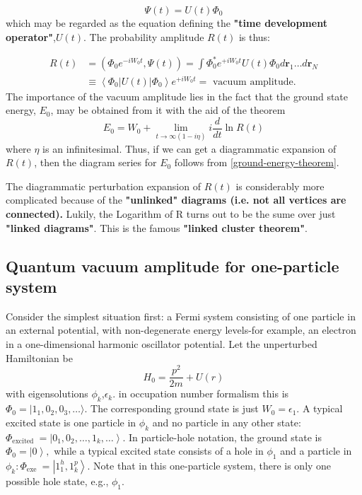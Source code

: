 \begin{equation}\Psi(t)=U(t) \Phi_{0}\end{equation}
which may be regarded as the equation defining the \textbf{"time development operator"},$U(t)$. The probability amplitude $R(t)$ is thus:
\begin{imp}
\begin{equation}\begin{aligned}
R(t) &=\left(\Phi_{0} e^{-i W_{0} t}, \Psi(t)\right)=\int \Phi_{0}^{*} e^{+i W_{0} t} U(t) \Phi_{0} d \mathbf{r}_{1} \dots d \mathbf{r}_{N} \\
& \equiv\left\langle\Phi_{0}|U(t)| \Phi_{0}\right\rangle e^{+i W_{0} t}=\text { vacuum amplitude. }
\end{aligned}
\label{vac-amp-def}
\end{equation}
The importance of the vacuum amplitude lies in the fact that the ground state energy, $E_{0}$, may be obtained from it with the aid of the theorem
\begin{equation}E_{0}=W_{0}+\lim _{t \rightarrow \infty(1-i \eta)} i \frac{d}{d t} \ln R(t)
\label{ground-energy-theorem}
\end{equation}
where $\eta$ is an infinitesimal. Thus, if we can get a diagrammatic expansion of $R(t)$, then the diagram series for $E_0$ follows from \ref{ground-energy-theorem}.
\end{imp}
\begin{mybox}
The diagrammatic perturbation expansion of $R(t)$ is considerably more complicated because of the \textbf{"unlinked" diagrams (i.e. not all vertices are connected).} Lukily, the Logarithm of R turns out to be the sume over just \textbf{"linked diagrams"}. This is the famous \textbf{"linked cluster theorem"}.
\end{mybox}

\subsection{Quantum vacuum amplitude for one-particle system}
Consider the simplest situation first: a Fermi system consisting of one particle in an external potential, with non-degenerate energy levels-for example, an electron in a one-dimensional harmonic oscillator potential. Let the unperturbed Hamiltonian be
$$H_{0}=\frac{p^{2}}{2 m}+U(r)$$
with eigensolutions $\phi_k$,$\epsilon_k$.  in occupation number formalism this is $\Phi_0=|1_1,0_2,0_3,\ldots\rangle$. The corresponding ground state is just $W_0=\epsilon_1$. A typical excited state is one particle in $\phi_{k}$ and no particle in any other state: $\Phi_{\text {excited }}=\left|0_{1}, 0_{2}, \ldots, 1_{k}, \ldots\right\rangle .$ In particle-hole notation, the ground state is $\left.\Phi_{0}=|0\right\rangle,$ while a typical excited state consists of a hole in $\phi_{1}$ and a particle in $\phi_{k}: \Phi_{\text {exe }}=\left|1_{1}^{h}, 1_{k}^p\right\rangle .$ Note that in this one-particle system, there is only one possible hole state, e.g., $\phi_{1}$.

